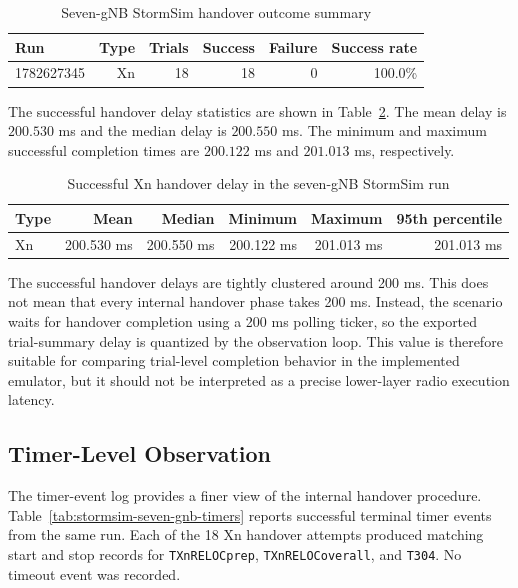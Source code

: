\begin{table}[H]
\centering
\caption{Seven-gNB StormSim handover outcome summary}
\begin{tabular}{lrrrrr}
\toprule
Run & Type & Trials & Success & Failure & Success rate\\
\midrule
1782627345 & Xn & 18 & 18 & 0 & 100.0\%\\
\bottomrule
\end{tabular}
\label{tab:stormsim-seven-gnb-summary}
\end{table}

The successful handover delay statistics are shown in Table~\ref{tab:stormsim-seven-gnb-delay}. The mean delay is \(200.530\) ms and the median delay is \(200.550\) ms. The minimum and maximum successful completion times are \(200.122\) ms and \(201.013\) ms, respectively.

\begin{table}[H]
\centering
\caption{Successful Xn handover delay in the seven-gNB StormSim run}
\begin{tabular}{lrrrrr}
\toprule
Type & Mean & Median & Minimum & Maximum & 95th percentile\\
\midrule
Xn & 200.530 ms & 200.550 ms & 200.122 ms & 201.013 ms & 201.013 ms\\
\bottomrule
\end{tabular}
\label{tab:stormsim-seven-gnb-delay}
\end{table}

The successful handover delays are tightly clustered around 200 ms. This does not mean that every internal handover phase takes 200 ms. Instead, the scenario waits for handover completion using a 200 ms polling ticker, so the exported trial-summary delay is quantized by the observation loop. This value is therefore suitable for comparing trial-level completion behavior in the implemented emulator, but it should not be interpreted as a precise lower-layer radio execution latency.

\subsection{Timer-Level Observation}

The timer-event log provides a finer view of the internal handover procedure. Table~\ref{tab:stormsim-seven-gnb-timers} reports successful terminal timer events from the same run. Each of the 18 Xn handover attempts produced matching start and stop records for \texttt{TXnRELOCprep}, \texttt{TXnRELOCoverall}, and \texttt{T304}. No timeout event was recorded.

